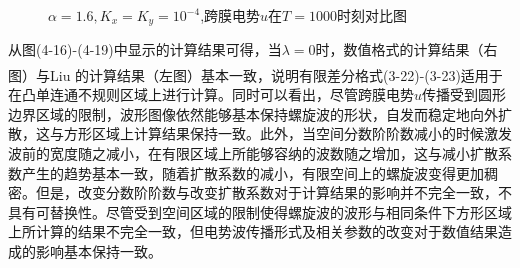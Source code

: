 \documentclass[twoside,UTF8]{nputhesis}
\newcommand{\upcite}[1]{\textsuperscript{\textsuperscript{\cite{#1}}}}
\begin{document}
\begin{figure}[htbp]
	
	\setlength{\abovecaptionskip}{-0.2cm} %
	\caption{$\alpha = 1.6,K_{x} = K_{y} = {10}^{-4}$,跨膜电势$u$在$T=1000$时刻对比图}
	\label{fig:1b}
	\vspace{-0.5cm} %
	

	
	
	
\end{figure}


从图(4-16)-(4-19)中显示的计算结果可得，当$\lambda =0$时，数值格式的计算结果（右图）与Liu 的计算结果（左图）\upcite{liu2015semi}基本一致，说明有限差分格式(3-22)-(3-23)适用于在凸单连通不规则区域上进行计算。同时可以看出，尽管跨膜电势$u$传播受到圆形边界区域的限制，波形图像依然能够基本保持螺旋波的形状，自发而稳定地向外扩散，这与方形区域上计算结果保持一致。此外，当空间分数阶阶数减小的时候激发波前的宽度随之减小，在有限区域上所能够容纳的波数随之增加，这与减小扩散系数产生的趋势基本一致，随着扩散系数的减小，有限空间上的螺旋波变得更加稠密。但是，改变分数阶阶数与改变扩散系数对于计算结果的影响并不完全一致，不具有可替换性。尽管受到空间区域的限制使得螺旋波的波形与相同条件下方形区域上所计算的结果不完全一致，但电势波传播形式及相关参数的改变对于数值结果造成的影响基本保持一致。\\
\end{document}
